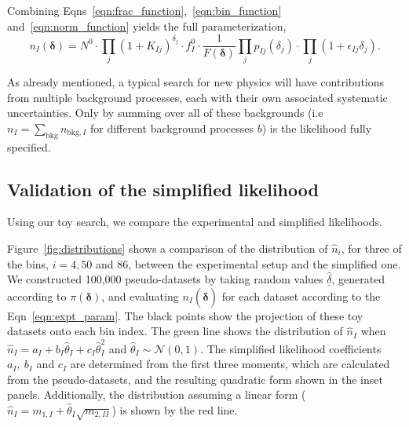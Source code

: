 \documentclass[11pt]{article}
\begin{document}
Combining Eqns~\ref{eqn:frac_function},~\ref{eqn:bin_function} and~\ref{eqn:norm_function} yields the full parameterization,
%
\begin{equation}
 n_{I}(\bm{\delta}) = N^{0}\cdot \prod_{j}(1+K_{Ij})^{\delta_{j}} \cdot f^{0}_{I} \cdot\frac{1}{F(\bm{\delta})} \prod_{j} p_{Ij}(\delta_{j}) \cdot \prod_{j} (1+\epsilon_{Ij}\delta_{j}).
\label{eqn:expt_param}
\end{equation}

As already mentioned, a typical search for new physics will have contributions from multiple background processes, each with their own associated systematic uncertainties.
Only by summing over all of these backgrounds (i.e $n_{I}=\sum_{\text{bkg}}n_{\text{bkg},I}$ for different background processes $b$) is the likelihood fully specified.


\subsection{Validation of the simplified likelihood}

Using our toy search, we compare the experimental and simplified likelihoods. 

Figure~\ref{fig:distributions} shows a comparison of the distribution of $\hat{n}_{i}$, for three of the bins, $i=4,50$ and $86$, between the experimental setup and the simplified one.
We constructed 100,000 pseudo-datasets by taking random values $\underline{\hat{\delta}}$, generated according to $\pi(\bm{\delta})$, and evaluating
$n_{I}(\hat{\bm{\delta}})$ for each dataset according to the Eqn~\ref{eqn:expt_param}. The black points show the projection of these toy datasets onto each bin index. The green line shows the
distribution of $\hat{n}_{I}$ when $\hat{n}_{I} = a_{I}+b_{I}\hat{\theta}_{I}+c_{I}\hat{\theta}_{I}^{2}$  and $\hat{\theta}_{I}\sim\mathcal{N}(0,1)$. The simplified likelihood coefficients
$a_{I},~b_{I}$ and $c_{I}$ are determined from the first three moments, which are calculated from the pseudo-datasets, and the resulting quadratic form shown in the inset panels. Additionally, the distribution
assuming a linear form ($\hat{n}_{I} = m_{1,I}+\hat{\theta}_{I}\sqrt{m_{2,II}}$) is shown by the red line.
\end{document}
